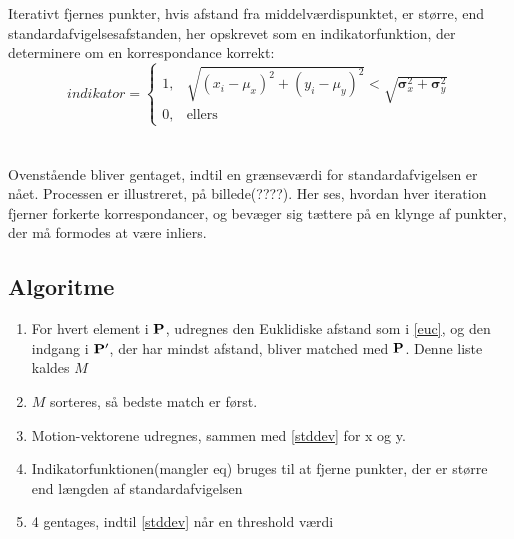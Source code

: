 Iterativt fjernes punkter, hvis afstand fra middelværdispunktet, er større, end standardafvigelsesafstanden, her opskrevet som en indikatorfunktion, der determinere om en korrespondance korrekt:
\[
indikator=
\begin{cases}
    1,& \sqrt{(x_i - \mu_x)^2 + (y_i - \mu_y)^2} < \sqrt{\boldsymbol\sigma_x^2 + \boldsymbol\sigma_y^2} \\
    0,& \text{ellers}
    \end{cases}
\]
\\
\\
Ovenstående bliver gentaget, indtil en grænseværdi for standardafvigelsen er nået. Processen er illustreret, på billede(????). Her ses, hvordan hver iteration fjerner forkerte korrespondancer, og bevæger sig tættere på en klynge af punkter, der må formodes at være inliers.
\subsection*{Algoritme}
\begin{enumerate}
\item{For hvert element i $\bold{P}$, udregnes den Euklidiske afstand som i \eqref{euc}, og den indgang i $\bold{P}'$, der har mindst afstand, bliver matched med $\bold{P}$. Denne liste kaldes $M$}
\item{$M$ sorteres, så bedste match er først.}
\item{Motion-vektorene udregnes, sammen med \eqref{stddev} for x og y.}
\item{Indikatorfunktionen(mangler eq) bruges til at fjerne punkter, der er større end længden af standardafvigelsen}
\item{4 gentages, indtil \eqref{stddev} når en threshold værdi}
\end{enumerate}